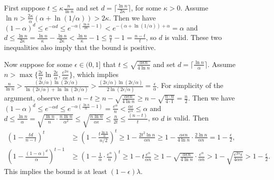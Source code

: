 First suppose $t\le \kappa \frac{n}{\ln n}$ and set $d=\lceil\frac{\ln n}{2\kappa}\rceil$, for some $\kappa>0$. Assume $\ln n> \frac{2\kappa}{\alpha}(\alpha+\ln(1/\alpha))>2\kappa$. Then we have $(1-\alpha)^d\le e^{-\alpha d}\le e^{-\alpha(\frac{\ln n}{2\kappa}-1)}< e^{-(\alpha+\ln(1/\alpha))+\alpha}=\alpha$ and $d\le\frac{\ln n}{2\kappa}=\frac{\ln n}{\kappa}-\frac{\ln n}{2\kappa}< \frac{\ln n}{\kappa}-1\le\frac{n}{t}-1=\frac{n-t}{t}$, so $d$ is valid. These two inequalities also imply that the bound is positive.



Now suppose for some $\epsilon\in(0,1]$ that $t\le \sqrt{\frac{\alpha\epsilon n}{4\ln n}}$ and set $d=\lceil \frac{\ln n}{\alpha}\rceil$. 
Assume $n>\max\{\frac{2\epsilon}{\alpha}\ln\frac{2\epsilon}{\alpha},\frac{e^{2\alpha}}{\alpha\epsilon}\}$, which implies $\frac{n}{\ln n}>\frac{(2\epsilon/\alpha)\ln(2\epsilon/\alpha)}{\ln(2\epsilon/\alpha)+\ln\ln(2\epsilon/\alpha)}>\frac{(2\epsilon/\alpha)\ln(2\epsilon/\alpha)}{2\ln(2\epsilon/\alpha)}=\frac{\epsilon}{\alpha}$. 
For simplicity of the argument, observe that
$n-t\ge n-\sqrt{\frac{\alpha\epsilon n}{4\ln n}}\ge n-\sqrt{\frac{n\cdot n}{4\cdot 1}}=\frac{n}{2}$.
Then we have 
$(1-\alpha)^d\le e^{-\alpha d}
\le e^{-\alpha(\frac{\ln n}{\alpha}-1)}
= \frac{e^\alpha}{n}
<\frac{\alpha\epsilon}{e^\alpha}\le\alpha$ 
and 
$d\le\frac{\ln n}{\alpha}
=\sqrt{\frac{\ln n}{n}\cdot\frac{n\ln n}{\alpha^2}}
\le\sqrt{\frac{n\ln n}{\alpha\epsilon}}\le\frac{n}{2t}\le\frac{(n-t)}{t}$, so $d$ is valid. Then
\begin{align*}
\left(1-\frac{td}{n-t}\right)^t 
&\ge \left(1-\frac{t \frac{\ln n}{\alpha}}{n/2}\right)^t 
\ge 1-\frac{2t^2 \ln n}{\alpha n} 
\ge 1-\frac{\alpha\epsilon n}{4\ln n}\cdot\frac{2 \ln n}{\alpha n}
= 1-\frac{\epsilon}{2},
\\
\left(1 - \frac{ (1-\alpha)^d}{\alpha}\right)^{t-1}
&\ge \left(1 - \frac{1}{\alpha}\cdot\frac{e^\alpha}{n}\right)^t
\ge 1 - t\frac{e^\alpha}{\alpha n}
\ge 1 - \sqrt{\frac{\alpha\epsilon n}{4\ln n}}\cdot\frac{e^\alpha}{\alpha n}
> 1-\sqrt{\frac{e^{2\alpha} \epsilon}{4\alpha n}}
> 1- \frac{\epsilon}{2}.
\end{align*}
This implies the bound is at least $(1-\epsilon)\lambda$.


